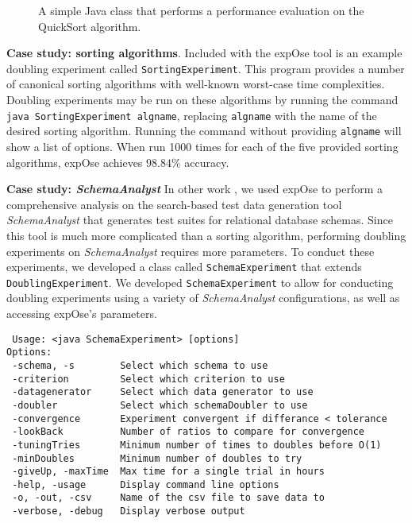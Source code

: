\documentclass[10pt,twocolumn]{article}
\newcommand{\toolname}{{\sc expOse}\xspace}
\begin{document}
    
    \begin{figure}[t]
    
    \vspace{-0.15in}
    \caption{A simple Java class that performs a performance evaluation
    on the QuickSort algorithm.}\vspace{-0.20in}
    \label{fig:qsprogram}
    \end{figure}

    {\bf Case study: sorting algorithms}.
    \lstset{language=bash}
    Included with the \toolname tool is an example doubling
    experiment called \texttt{SortingExperiment}.  This program provides a number
    of canonical sorting algorithms with well-known worst-case time
    complexities.  Doubling experiments may be run on these algorithms
    by running the command \texttt{java SortingExperiment algname},
    replacing \texttt{algname} with the name of the desired sorting
    algorithm. Running the command without providing \texttt{algname}
    will show a list of options. When run 1000 times for each of the
    five provided sorting algorithms, \toolname achieves $98.84\%$
    accuracy.

    {\bf Case study: \textit{SchemaAnalyst}}
    In other work \cite{kinneer2015}, we used \toolname to perform a
    comprehensive analysis on the search-based test data generation 
    tool \textit{SchemaAnalyst} \cite{kapfhammer2013} that generates
    test suites for relational database schemas. Since this tool is much 
    more complicated than a sorting algorithm, performing doubling experiments on
    \textit{SchemaAnalyst} requires more parameters.  To conduct these
    experiments, we developed a class called \texttt{SchemaExperiment}
    that extends \texttt{DoublingExperiment}.  We developed 
    \texttt{SchemaExperiment} to allow for conducting doubling
    experiments using a variety of \textit{SchemaAnalyst} configurations,
    as well as accessing \toolname's parameters.

{\scriptsize
\begin{verbatim}
 Usage: <java SchemaExperiment> [options]
Options:  
 -schema, -s        Select which schema to use 
 -criterion         Select which criterion to use 
 -datagenerator     Select which data generator to use 
 -doubler           Select which schemaDoubler to use 
 -convergence       Experiment convergent if differance < tolerance 
 -lookBack          Number of ratios to compare for convergence 
 -tuningTries       Minimum number of times to doubles before O(1)  
 -minDoubles        Minimum number of doubles to try 
 -giveUp, -maxTime  Max time for a single trial in hours 
 -help, -usage      Display command line options 
 -o, -out, -csv     Name of the csv file to save data to 
 -verbose, -debug   Display verbose output 
\end{verbatim}
}
\end{document}
